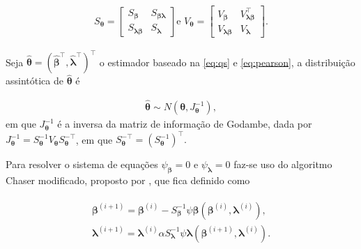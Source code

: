 \begin{equation}
      \begin{aligned}
S_{\boldsymbol{\theta}} = \begin{bmatrix}
S_{\boldsymbol{\beta}} & S_{\boldsymbol{\beta\lambda}} \\ 
S_{\boldsymbol{\lambda\beta}} & S_{\boldsymbol{\lambda}} 
\end{bmatrix} \text{e } V_{\boldsymbol{\theta}} = \begin{bmatrix}
V_{\boldsymbol{\beta}} & V^{\top}_{\boldsymbol{\lambda\beta}} \\ 
V_{\boldsymbol{\lambda\beta}} & V_{\boldsymbol{\lambda}} 
\end{bmatrix}.
\end{aligned}
\end{equation}

Seja $\boldsymbol{\hat{\theta}} = (\boldsymbol{\hat{\beta}^{\top}}, \boldsymbol{\hat{\lambda}^{\top}})^{\top}$ o estimador baseado na \autoref{eq:qs} e \autoref{eq:pearson}, a distribuição assintótica de $\boldsymbol{\hat{\theta}}$ é

\begin{equation}
\begin{aligned}
\boldsymbol{\hat{\theta}} \sim N(\boldsymbol{\theta}, J_{\boldsymbol{\theta}}^{-1}),
\end{aligned}
\end{equation}
\noindent em que $J_{\boldsymbol{\theta}}^{-1}$ é a inversa da matriz de informação de Godambe, dada por
$J_{\boldsymbol{\theta}}^{-1} = S_{\boldsymbol{\theta}}^{-1} V_{\boldsymbol{\theta}} S_{\boldsymbol{\theta}}^{-\top}$, em que $S_{\boldsymbol{\theta}}^{-\top} = (S_{\boldsymbol{\theta}}^{-1})^{\top}.$

Para resolver o sistema de equações $\psi_{\boldsymbol{\beta}} = 0$ e $\psi_{\boldsymbol{\lambda}} = 0$ faz-se uso do algoritmo Chaser modificado, proposto por \citet{jorg04}, que fica definido como

\begin{equation}
\begin{aligned}
\begin{matrix}
\boldsymbol{\beta}^{(i+1)} = \boldsymbol{\beta}^{(i)}- S_{\boldsymbol{\beta}}^{-1} \psi \boldsymbol{\beta} (\boldsymbol{\beta}^{(i)}, \boldsymbol{\lambda}^{(i)}), \\ 
\boldsymbol{\lambda}^{(i+1)} = \boldsymbol{\lambda}^{(i)}\alpha S_{\boldsymbol{\lambda}}^{-1} \psi \boldsymbol{\lambda} (\boldsymbol{\beta}^{(i+1)}, \boldsymbol{\lambda}^{(i)}).
\end{matrix}
\end{aligned}
\end{equation}

